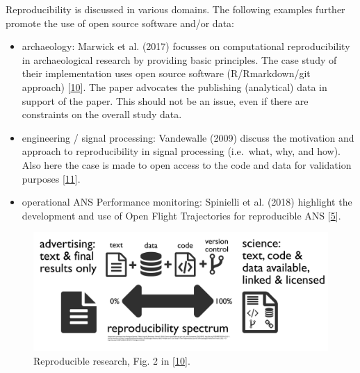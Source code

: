 \documentclass[conference,final,a4paper,]{IEEEtran}
\providecommand{\tightlist}{%
  \setlength{\itemsep}{0pt}\setlength{\parskip}{0pt}}
\begin{document}
Reproducibility is discussed in various domains. The following examples
further promote the use of open source software and/or data:

\begin{itemize}
\tightlist
\item
  archaeology: Marwick et al. (2017) focusses on computational
  reproducibility in archaeological research by providing basic
  principles. The case study of their implementation uses open source
  software (R/Rmarkdown/git approach)
  {[}\protect\hyperlink{ref-marwick_2017}{10}{]}. The paper advocates
  the publishing (analytical) data in support of the paper. This should
  not be an issue, even if there are constraints on the overall study
  data.
\item
  engineering / signal processing: Vandewalle (2009) discuss the
  motivation and approach to reproducibility in signal processing
  (i.e.~what, why, and how). Also here the case is made to open access
  to the code and data for validation purposes
  {[}\protect\hyperlink{ref-vandewalle_2009}{11}{]}.
\item
  operational ANS Performance monitoring: Spinielli et al. (2018)
  highlight the development and use of Open Flight Trajectories for
  reproducible ANS {[}\protect\hyperlink{ref-spinielli_2018}{5}{]}.
\end{itemize}




\begin{figure}[hbt]

{\centering \includegraphics[width=1\linewidth]{figures/reproducible-research-spectrum} 

}

\caption{Reproducible research, Fig. 2 in
{[}\protect\hyperlink{ref-marwick_2017}{10}{]}.}\label{fig:reproducible-research}
\end{figure}
\end{document}
